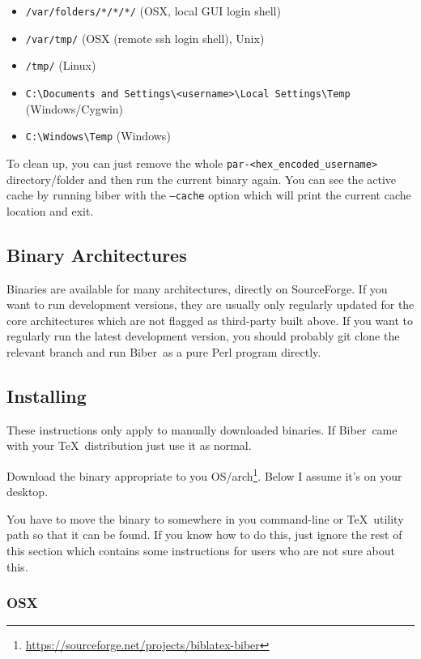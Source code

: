\documentclass{ltxdockit}
\newcommand*{\biber}{Biber\xspace}
\begin{document}
\begin{itemize}
\item \verb+/var/folders/*/*/*/+ (OSX, local GUI login shell)
\item \verb+/var/tmp/+ (OSX (remote ssh login shell), Unix)
\item \verb+/tmp/+ (Linux)
\item \verb+C:\Documents and Settings\<username>\Local Settings\Temp+ (Windows/Cygwin)
\item \verb+C:\Windows\Temp+ (Windows)
\end{itemize}

\noindent To clean up, you can just remove the whole \verb+par-<hex_encoded_username>+
directory/folder and then run the current binary again. You can see the active cache by running biber with the \texttt{--cache} option which will print the current cache location and exit.

\subsection{Binary Architectures}

Binaries are available for many architectures, directly on SourceForge. If
you want to run development versions, they are usually only regularly
updated for the core architectures which are not flagged as third-party
built above. If you want to regularly run the latest development version,
you should probably git clone the relevant branch and run \biber\ as a pure
Perl program directly.

\subsection{Installing}

These instructions only apply to manually downloaded binaries. If
\biber\ came with your \TeX\ distribution just use it as normal.

Download the binary appropriate to you
OS/arch\footnote{\url{https://sourceforge.net/projects/biblatex-biber}}. Below
I assume it's on your desktop.

You have to move the binary to somewhere in you command-line or \TeX\ utility
path so that it can be found. If you know how to do this, just ignore the
rest of this section which contains some instructions for users who are
not sure about this.

\subsubsection{OSX}
\end{document}
